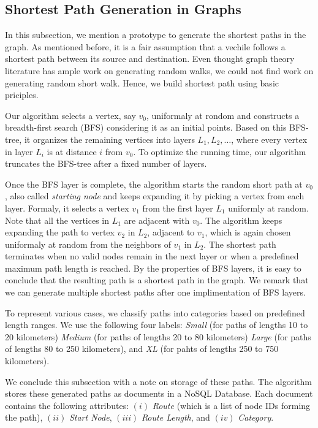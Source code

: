 \documentclass[sigplan,screen]{acmart}
\begin{document}
 \subsection{Shortest Path Generation in Graphs}

In this subsection, we mention a prototype to generate
the shortest paths in the graph.
As mentioned before, it is a fair assumption that a vechile
follows a shortest path between its source and destination.
Even thought graph theory literature has ample work
on generating random walks, we could not find
work on generating random short walk.
Hence, we build shortest path using basic priciples. 

Our algorithm selects a vertex, say $v_0$, uniformaly at rondom 
and constructs a breadth-first search (BFS) considering
it as an initial points. 
Based on this BFS-tree, it organizes the remaining vertices
into layers $L_1, L_2, \dots$, where every vertex
in layer $L_i$ is at distance $i$ from $v_0$.
To optimize the running time, our algorithm truncates the BFS-tree
after a fixed number of layers.

Once the BFS layer is complete, the algorithm starts the random
short path at $v_0$, also called  \emph{starting node}
and keeps expanding it by picking a vertex from each layer.
Formaly, it selects a vertex $v_1$ from the first layer $L_1$ uniformly at 
random.
Note that all the vertices in $L_1$ are adjacent with $v_0$.
The algorithm keeps expanding the path to vertex $v_2$ in $L_2$, adjacent to $v_1$, which is again chosen uniformaly at random
from the neighbors of $v_1$ in $L_2$.
The shortest path terminates when no valid nodes remain in the next layer or 
when a predefined maximum path length is reached.
By the properties of BFS layers, it is easy to conclude that the resulting
path is a shortest path in the graph.
We remark that we can generate multiple shortest paths 
after one implimentation of BFS layers.

To represent various cases, we classify paths into categories based on predefined length ranges.
We use the following four labels:
\emph{Small} (for paths of lengths 10 to 20 kilometers)
\emph{Medium} (for paths of lengths 20 to 80 kilometers)
\emph{Large} (for paths of lengths 80 to 250 kilometers), and
\emph{XL} (for pahts of lengths 250 to 750 kilometers).

We conclude this subsection with a note on storage of these paths.
The algorithm stores these generated paths as documents in a 
\textsf{NoSQL} Database.
Each document contains the following attributes:
$(i)$ \emph{Route} (which is a list of node IDs forming the path),
$(ii)$ \emph{Start Node}, 
$(iii)$ \emph{Route Length}, and
$(iv)$ \emph{Category}.
\end{document}
